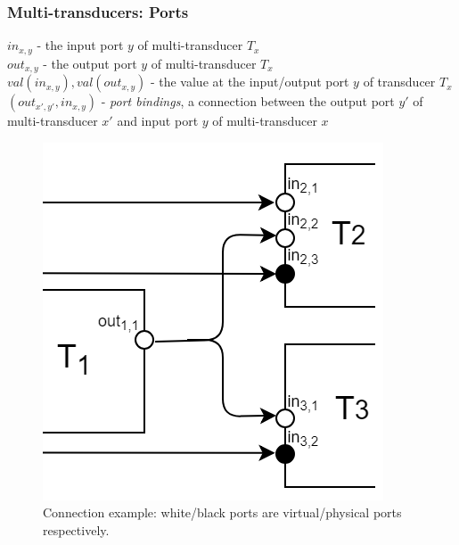 \documentclass{beamer}
\theoremstyle{definition}
\theoremstyle{plain}
\begin{document}
\begin{frame}
\frametitle{Multi-transducers: Ports}

\begin{minipage}{0.5\textwidth}
$ in_{x, y} $ - the input port $y$ of multi-transducer $T_{x}$\\
$ out_{x, y} $ - the output port $y$ of multi-transducer $T_{x}$\\
$ val(in_{x,y}), val(out_{x,y})$ - the value at the input/output port $y$ of transducer $T_{x}$\\
$ (out_{x', y'}, in_{x, y})$ - \textit{port bindings}, a connection between the output port $y'$ of multi-transducer $x'$ and input port $y$ of multi-transducer $x$\\
\end{minipage}
\hspace{0.4cm}
\begin{minipage}{0.4\textwidth}
\begin{figure}
\includegraphics[scale=1]{images/mult_ports.png}
\caption{Connection example: white/black ports are virtual/physical ports respectively.}
\label{multi_ports}
\end{figure}
\end{minipage}

\end{frame}
\end{document}
